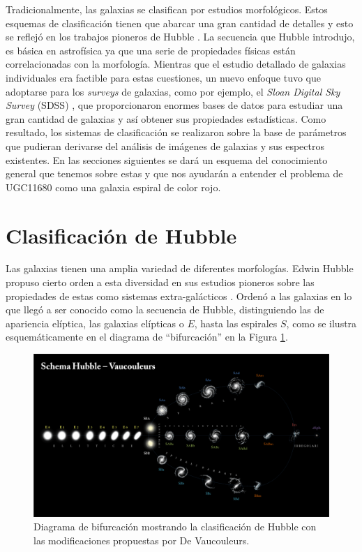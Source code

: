 \bigskip

\noindent Tradicionalmente, las galaxias se clasifican por estudios morfológicos. Estos esquemas de clasificación tienen que abarcar una
gran cantidad de detalles y esto se reflejó en los trabajos pioneros de Hubble \citep{hubble1936}.
La secuencia que Hubble introdujo, es básica en  astrofísica ya que una serie de propiedades físicas están correlacionadas con la morfología. Mientras que el estudio detallado de galaxias individuales era factible para estas cuestiones, un nuevo enfoque
tuvo que adoptarse para los \textsl{surveys} de galaxias, como por ejemplo, el \textsl{Sloan Digital Sky Survey} (SDSS) \citep{york2000},
que proporcionaron enormes bases de datos para estudiar una gran cantidad  de galaxias y así obtener sus propiedades estadísticas. Como resultado, los sistemas de clasificación se realizaron sobre la base de parámetros que pudieran derivarse del análisis de imágenes de galaxias y sus espectros existentes. En las secciones siguientes se dará un esquema  del conocimiento general que tenemos sobre estas y que nos ayudarán a entender el problema de UGC11680 como una galaxia espiral de color rojo.

\section{Clasificación de Hubble}

Las galaxias tienen una amplia variedad de diferentes morfologías. Edwin Hubble propuso cierto orden a esta diversidad en sus estudios
pioneros sobre las propiedades de estas como sistemas extra-galácticos \citep{hubble1936}. Ordenó a las galaxias en lo que
llegó a ser conocido como la secuencia de Hubble, distinguiendo las de apariencia elíptica, las galaxias elípticas o $E$, hasta las
espirales $S$, como se ilustra esquemáticamente en el diagrama de ``bifurcación'' en la Figura \ref{tuningfork}.

\begin{figure}
  \centering
    \includegraphics[scale=0.6]{hubble_mod.png}
  \caption[Diagrama de Hubble]{Diagrama de bifurcación mostrando la clasificación de Hubble con las modificaciones propuestas por De Vaucouleurs.}
  \label{tuningfork}
\end{figure}

